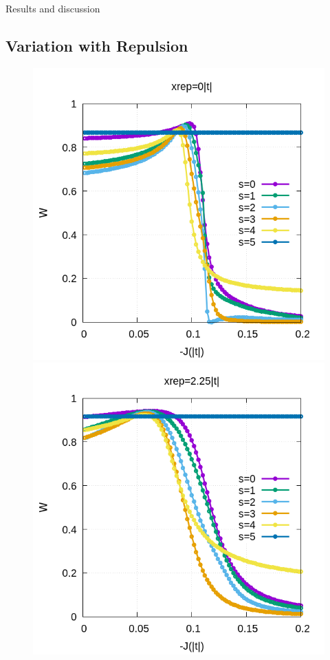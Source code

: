 \documentclass[12pt,twoside]{report}
\begin{document}
\begin{chapter}{Results and discussion}
	
	\subsection{Variation with Repulsion}
	\begin{figure}[h!]
		\centering
		\hspace{-2cm}
		\begin{minipage}{0.4\textwidth}
			\includegraphics[scale=0.4]{W_vs_J_sites_2-xrep-01.png}
		\end{minipage}
		\hspace{2cm}
		\begin{minipage}{0.4\textwidth}
			\includegraphics[scale=0.4]{W_vs_J_sites_2-xrep-225.png}

\end{minipage}
\end{figure}
\end{chapter}
\end{document}
